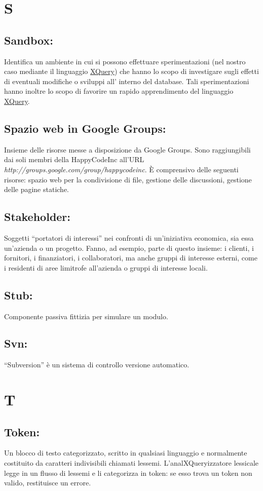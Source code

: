 \chapter{S}
\section{Sandbox:}
Identifica un ambiente in cui si possono effettuare sperimentazioni (nel nostro caso mediante il linguaggio \hyperlink{XQuery}{XQuery}) che hanno lo scopo di investigare sugli effetti di eventuali modifiche o sviluppi all' interno del database. Tali sperimentazioni hanno inoltre lo scopo di favorire un rapido apprendimento del linguaggio \hyperlink{XQuery}{XQuery}.
\hypertarget{Spazio web in Google Groups}{}
\section{Spazio web in Google Groups:}
Insieme delle risorse messe a disposizione da Google Groups. Sono raggiungibili dai soli membri della HappyCodeInc all'URL\\ \textit{http://groups.google.com/group/happycodeinc}. \`E comprensivo delle seguenti risorse: spazio web per la condivisione di file, gestione delle discussioni, gestione delle pagine statiche.
\section{Stakeholder:}
Soggetti ``portatori di interessi'' nei confronti di un'iniziativa economica, sia essa un'azienda o un progetto. Fanno, ad esempio, parte di questo insieme: i clienti, i fornitori, i finanziatori, i collaboratori, ma anche gruppi di interesse esterni, come i residenti di aree limitrofe all'azienda o gruppi di interesse locali.
\section{Stub:}
Componente passiva fittizia per simulare un modulo.
\section{Svn:}
``Subversion'' \`e un sistema di controllo versione automatico. 

\chapter{T}
\section{Token:}
Un blocco di testo categorizzato, scritto in qualsiasi linguaggio e normalmente costituito da caratteri indivisibili chiamati lessemi. L'analXQueryizzatore lessicale legge in un flusso di lessemi e li categorizza in token: se esso trova un token non valido, restituisce un errore.


